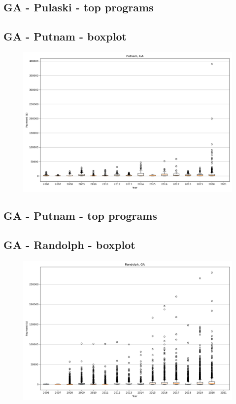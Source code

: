 \subsection*{GA - Pulaski - top programs}

\newpage
\subsection*{GA - Putnam - boxplot}
\begin{figure}[h]
\centering
\includegraphics[width=7in]{../output/boxplots/counties/Putnam-GA_boxplot.png}
\end{figure}


\subsection*{GA - Putnam - top programs}

\newpage
\subsection*{GA - Randolph - boxplot}
\begin{figure}[h]
\centering
\includegraphics[width=7in]{../output/boxplots/counties/Randolph-GA_boxplot.png}
\end{figure}


